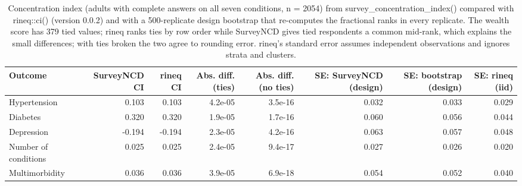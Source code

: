 \begin{table}[htbp]

\caption{\label{tab:tab_validation_rineq}Concentration index (adults with complete answers on all seven conditions, n = 2054) from survey\_concentration\_index() compared with rineq::ci() (version 0.0.2) and with a 500-replicate design bootstrap that re-computes the fractional ranks in every replicate. The wealth score has 379 tied values; rineq ranks ties by row order while SurveyNCD gives tied respondents a common mid-rank, which explains the small differences; with ties broken the two agree to rounding error. rineq's standard error assumes independent observations and ignores strata and clusters.}
\centering
\scriptsize\setlength{\tabcolsep}{3pt}
\begin{adjustbox}{max width=\linewidth}
\begin{tabular}{lrrrrrrr}
\toprule
Outcome & SurveyNCD CI & rineq CI & Abs. diff. (ties) & Abs. diff. (no ties) & SE: SurveyNCD (design) & SE: bootstrap (design) & SE: rineq (iid)\\
\midrule
Hypertension & 0.103 & 0.103 & 4.2e-05 & 3.5e-16 & 0.032 & 0.033 & 0.029\\
Diabetes & 0.320 & 0.320 & 1.9e-05 & 1.7e-16 & 0.060 & 0.056 & 0.044\\
Depression & -0.194 & -0.194 & 2.3e-05 & 4.2e-16 & 0.063 & 0.057 & 0.048\\
Number of conditions & 0.025 & 0.025 & 2.4e-05 & 9.4e-17 & 0.027 & 0.026 & 0.020\\
Multimorbidity & 0.036 & 0.036 & 3.9e-05 & 6.9e-18 & 0.054 & 0.052 & 0.040\\
\bottomrule
\end{tabular}
\end{adjustbox}
\end{table}

